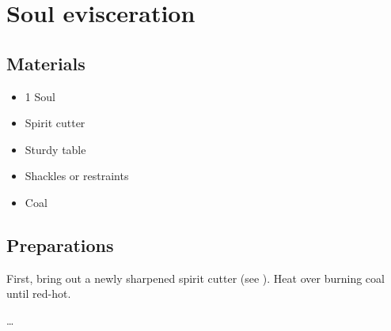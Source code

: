 \documentclass[letterpaper,twocolumn,openany,nodeprecatedcode]{astroinfernobook}
\begin{document}
\chapter{Soul evisceration} \label{ch:slaughter}

\section{Materials} \label{sec:materials}
\begin{itemize}
\item 1 Soul
\item Spirit cutter
\item Sturdy table
\item Shackles or restraints
\item Coal
\end{itemize}
\section{Preparations}
First, bring out a newly sharpened spirit cutter (see ). Heat over burning coal until red-hot.

\ldots
\end{document}
